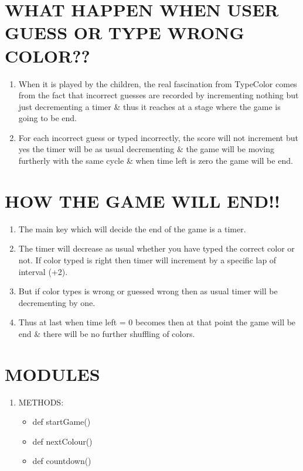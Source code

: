 \documentclass[12pt]{article}
\begin{document}
\section{WHAT HAPPEN WHEN USER GUESS OR TYPE WRONG COLOR??}
\begin{enumerate}
	\item When it is played by the children, the real fascination  from TypeColor comes from the fact that incorrect guesses are recorded by incrementing nothing but just decrementing a timer \& thus it reaches at a stage where the game is going to be end.
	
	\item For each incorrect guess or typed incorrectly, the score will not increment but yes the timer will be as usual decrementing \& the game will be moving furtherly with the same cycle \& when time left is zero the game will be end. 
\end{enumerate}

\section{HOW THE GAME WILL END!!}
\begin{enumerate}
	\item The main key which will decide the end of the game is a timer.
	\item The timer will decrease as usual whether you have typed the correct color or not. If color typed is right then timer will increment by a specific lap of interval (+2).
	
	\item But if color types is wrong or guessed wrong then as usual timer will be decrementing by one.
	
	\item Thus at last when time left = 0 becomes then at that point the game will be end \& there will be no further shuffling of colors.
\end{enumerate}	

\section{MODULES}

\begin{enumerate}
	\item METHODS:
	
	\begin{itemize}
		\item def startGame()
		\item def nextColour()
		\item def countdown()		
	\end{itemize}
\end{enumerate}
\end{document}
